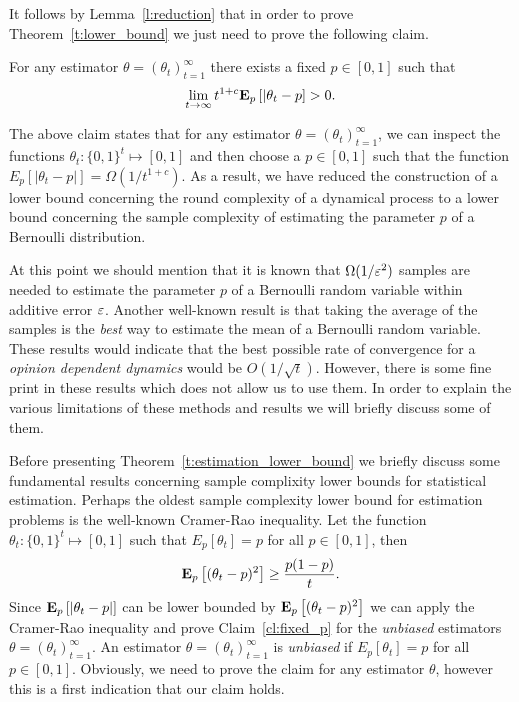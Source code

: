 \noindent It follows by Lemma~\ref{l:reduction} that in order to prove Theorem~\ref{t:lower_bound} we
just need to prove the following claim.

\begin{claim}\label{cl:fixed_p}
  For any estimator $\theta = (\theta_t)_{t=1}^\infty$
  there exists a fixed $p \in [0,1]$ such that
  \[
    \lim_{t \to \infty} t^{1+c} \bm{\mathrm{E}}_{p} \left[ |\theta_t - p \right] > 0.
  \]
\end{claim}
The above claim states that for any estimator $\theta=(\theta_t)_{t=1}^\infty$,
we can inspect the functions $\theta_t: \{0,1\}^t \mapsto [0,1]$ and then choose
a $p \in [0,1]$ such that the function $E_p[|\theta_t-p|]= \Omega(1/t^{1+c})$. As
a result, we have reduced the construction of a lower bound concerning the round
complexity of a dynamical process to a lower bound concerning the sample complexity of
estimating the parameter $p$ of a Bernoulli distribution.

At this point we should mention that it is known
that $\Omega(1/\varepsilon^2)$ samples are needed to estimate the parameter $p$
of a Bernoulli random variable within additive error $\varepsilon$.
Another well-known result is that taking the average of the samples
is the \emph{best} way to estimate the mean of a Bernoulli random variable.
These results would indicate that the best possible rate of convergence
for a \emph{opinion dependent dynamics} would be $O(1/\sqrt{t})$.
However, there is some fine print in these results which does not allow us
to use them. In order to explain the various limitations of
these methods and results we will briefly discuss some of them.

Before presenting Theorem~\ref{t:estimation_lower_bound} we briefly discuss some
fundamental results concerning sample complixity lower bounds for statistical estimation.
Perhaps the oldest sample complexity lower bound for estimation problems
is the well-known Cramer-Rao inequality.
Let the function $\theta_t: \{0,1\}^t \mapsto [0,1]$ such that $E_p[\theta_t]=p$ for
all $p \in [0,1]$, then
\begin{equation}\label{eq:crlb}
  \bm{\mathrm{E}}_{p} \left[ (\theta_t - p)^2 \right] \geq \frac{p(1-p)}{t}.
\end{equation}
Since $\bm{\mathrm{E}}_{p} \left[ |\theta_t - p| \right]$ can be lower bounded
by $\bm{\mathrm{E}}_{p} \left[ (\theta_t - p)^2 \right]$ we can apply the Cramer-Rao inequality and
prove Claim~\ref{cl:fixed_p} for the \emph{unbiased} estimators
$\theta =(\theta_t)_{t=1}^\infty$. An estimator $\theta =(\theta_t)_{t=1}^\infty$
is \emph{unbiased} if $E_p[\theta_t]=p$ for all $p \in [0,1]$. Obviously, we need
to prove the claim for any estimator $\theta$, however this is a first indication
that our claim holds.

